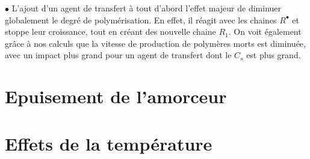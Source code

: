 \documentclass[a4paper,oneside,12pt]{article}
\begin{document}
\space

$\bullet$ L'ajout d'un agent de transfert à tout d'abord l'effet majeur de diminuer globalement le degré de polymérisation. En effet, il réagit avec les chaines $R^\bullet$ et stoppe leur croissance, tout en créant des nouvelle chaine $R_1$. On voit également grâce à nos calculs que la vitesse de production de polymères morts est diminuée, avec un impact plus grand pour un agent de transfert dont le $C_s$ est plus grand.

\part{Epuisement de l'amorceur}

\part{Effets de la température}
\end{document}
